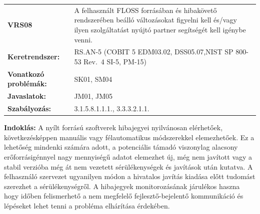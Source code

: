 \documentclass[12pt,magyar,a4paper,oneside]{scrreprt}
\begin{document}
\begin{longtable}[]{@{}ll@{}}
\toprule
\endhead
\begin{minipage}[t]{0.16\columnwidth}\raggedright
\textbf{VRS08}\strut
\end{minipage} & \begin{minipage}[t]{0.79\columnwidth}\raggedright
A felhasznált FLOSS forrásában és hibakövető rendszerében beálló
változásokat figyelni kell és/vagy ilyen szolgáltatást nyújtó partner
segítségét kell igénybe venni.\strut
\end{minipage}\tabularnewline
\begin{minipage}[t]{0.16\columnwidth}\raggedright
\textbf{Keretrendszer:}\strut
\end{minipage} & \begin{minipage}[t]{0.79\columnwidth}\raggedright
RS.AN-5 (COBIT 5 EDM03.02, DSS05.07,NIST SP 800-53 Rev.~4 SI-5,
PM-15)\strut
\end{minipage}\tabularnewline
\begin{minipage}[t]{0.16\columnwidth}\raggedright
\textbf{Vonatkozó problémák:}\strut
\end{minipage} & \begin{minipage}[t]{0.79\columnwidth}\raggedright
SK01, SM04\strut
\end{minipage}\tabularnewline
\begin{minipage}[t]{0.16\columnwidth}\raggedright
\textbf{Javaslatok:}\strut
\end{minipage} & \begin{minipage}[t]{0.79\columnwidth}\raggedright
JM01, JM05\strut
\end{minipage}\tabularnewline
\begin{minipage}[t]{0.16\columnwidth}\raggedright
\textbf{Szabályozás:}\strut
\end{minipage} & \begin{minipage}[t]{0.79\columnwidth}\raggedright
3.1.5.8.1.1.1., 3.3.3.2.1.1.\strut
\end{minipage}\tabularnewline
\bottomrule
\end{longtable}

\textbf{Indoklás: } A nyílt forrású szoftverek hibajegyei nyilvánosan
elérhetőek, következésképpen manuális vagy félautomatikus módszerekkel
elemezhetőek. Ez a lehetőség mindenki számára adott, a potenciális
támadó viszonylag alacsony erőforrásigénnyel nagy mennyiségű adatot
elemezhet új, még nem javított vagy a stabil verzióba még át nem
vezetett sérülékenységek és javítások után kutatva. A felhasználó
szervezet ugyanilyen módon a hivatalos javítás kiadása előtt tudomást
szerezhet a sérülékenységről. A hibajegyek monitorozásának járulékos
haszna hogy időben felismerhető a nem megfelelő fejlesztő-bejelentő
kommunikáció és lépéseket lehet tenni a probléma elhárítása érdekében.
\end{document}
